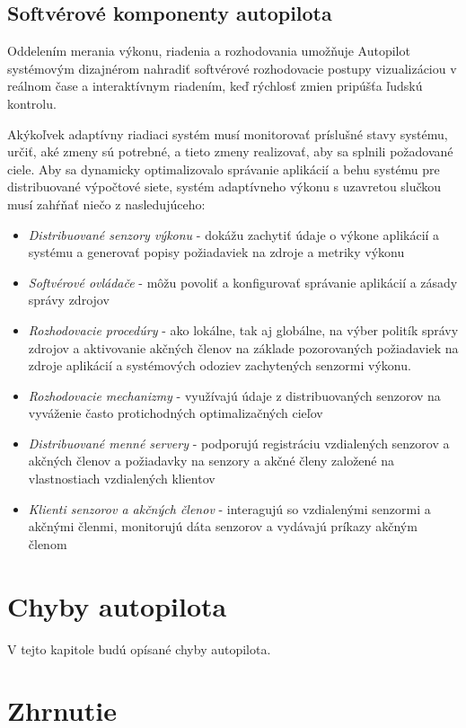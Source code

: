 \documentclass[10pt,twoside,slovak,a4paper]{article}
\begin{document}
\subsection{Softvérové komponenty autopilota}

Oddelením merania výkonu, riadenia a rozhodovania umožňuje Autopilot systémovým dizajnérom nahradiť softvérové rozhodovacie postupy vizualizáciou v reálnom čase a interaktívnym riadením, keď rýchlosť zmien pripúšťa ľudskú kontrolu.

Akýkoľvek adaptívny riadiaci systém musí monitorovať príslušné stavy systému, určiť, aké zmeny sú potrebné, a tieto zmeny realizovať, aby sa splnili požadované ciele. Aby sa dynamicky optimalizovalo správanie aplikácií a behu systému pre distribuované výpočtové siete, systém adaptívneho výkonu s uzavretou slučkou musí zahŕňať
niečo z nasledujúceho:

\begin{itemize}
\item \emph{Distribuované senzory výkonu} - dokážu zachytiť údaje o výkone aplikácií a systému a generovať popisy požiadaviek na zdroje a metriky výkonu
\item \emph{Softvérové ovládače} - môžu povoliť a konfigurovať správanie aplikácií a zásady správy zdrojov
\item \emph{Rozhodovacie procedúry} - ako lokálne, tak aj globálne, na výber politík správy zdrojov a aktivovanie akčných členov na základe pozorovaných požiadaviek na zdroje aplikácií a systémových odoziev zachytených senzormi výkonu.
\item \emph{Rozhodovacie mechanizmy} - využívajú údaje z distribuovaných senzorov na vyváženie často protichodných optimalizačných cieľov
\item \emph{Distribuované menné servery} - podporujú registráciu vzdialených senzorov a akčných členov a požiadavky na senzory a akčné členy založené na vlastnostiach vzdialených klientov
\item \emph{Klienti senzorov a akčných členov} - interagujú so vzdialenými senzormi a akčnými členmi, monitorujú dáta senzorov a vydávajú príkazy akčným členom \cite{SoftverAutopilot}
\end{itemize}

\section{Chyby autopilota} \label{chyby}

V tejto kapitole budú opísané chyby autopilota.

\section{Zhrnutie}


 
\end{document}
